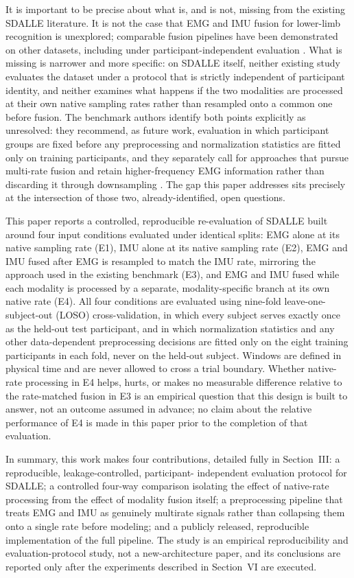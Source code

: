 \documentclass[conference]{IEEEtran}
\begin{document}
It is important to be precise about what is, and is not, missing
from the existing SDALLE literature. It is not the case that EMG and
IMU fusion for lower-limb recognition is unexplored; comparable
fusion pipelines have been demonstrated on other datasets, including
under participant-independent evaluation
\cite{ruhrbergestevez2025ankleexo, xu2026dsaf}. What is missing is
narrower and more specific: on SDALLE itself, neither existing study
evaluates the dataset under a protocol that is strictly independent
of participant identity, and neither examines what happens if the
two modalities are processed at their own native sampling rates
rather than resampled onto a common one before fusion. The benchmark
authors identify both points explicitly as unresolved: they
recommend, as future work, evaluation in which participant groups
are fixed before any preprocessing and normalization statistics are
fitted only on training participants, and they separately call for
approaches that pursue multi-rate fusion and retain higher-frequency
EMG information rather than discarding it through downsampling
\cite{farouk2026sdalle}. The gap this paper addresses sits precisely
at the intersection of those two, already-identified, open
questions.

This paper reports a controlled, reproducible re-evaluation of
SDALLE built around four input conditions evaluated under identical
splits: EMG alone at its native sampling rate (E1), IMU alone at its
native sampling rate (E2), EMG and IMU fused after EMG is resampled
to match the IMU rate, mirroring the approach used in the existing
benchmark (E3), and EMG and IMU fused while each modality is
processed by a separate, modality-specific branch at its own native
rate (E4). All four conditions are evaluated using nine-fold
leave-one-subject-out (LOSO) cross-validation, in which every
subject serves exactly once as the held-out test participant, and in
which normalization statistics and any other data-dependent
preprocessing decisions are fitted only on the eight training
participants in each fold, never on the held-out subject. Windows
are defined in physical time and are never allowed to cross a trial
boundary. Whether native-rate processing in E4 helps, hurts, or
makes no measurable difference relative to the rate-matched fusion
in E3 is an empirical question that this design is built to answer,
not an outcome assumed in advance; no claim about the relative
performance of E4 is made in this paper prior to the completion of
that evaluation.

In summary, this work makes four contributions, detailed fully in
Section~III: a reproducible, leakage-controlled, participant-
independent evaluation protocol for SDALLE; a controlled four-way
comparison isolating the effect of native-rate processing from the
effect of modality fusion itself; a preprocessing pipeline that
treats EMG and IMU as genuinely multirate signals rather than
collapsing them onto a single rate before modeling; and a publicly
released, reproducible implementation of the full pipeline. The
study is an empirical reproducibility and evaluation-protocol study,
not a new-architecture paper, and its conclusions are reported only
after the experiments described in Section~VI are executed.
\end{document}
